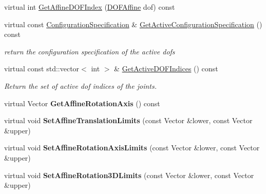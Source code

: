 \begin{DoxyCompactItemize}
\item 
virtual int \hyperlink{classOpenRAVE_1_1RobotBase_a7cfd3a308f74598a3a33a5010137c632}{GetAffineDOFIndex} (\hyperlink{namespaceOpenRAVE_a3016e2185103f3c1bdc5e4482893ca98}{DOFAffine} dof) const 
\item 
\hypertarget{classOpenRAVE_1_1RobotBase_aacdc590ce4cd7f988710a1f684d2d425}{
virtual const \hyperlink{classOpenRAVE_1_1ConfigurationSpecification}{ConfigurationSpecification} \& \hyperlink{classOpenRAVE_1_1RobotBase_aacdc590ce4cd7f988710a1f684d2d425}{GetActiveConfigurationSpecification} () const }
\label{classOpenRAVE_1_1RobotBase_aacdc590ce4cd7f988710a1f684d2d425}

\begin{DoxyCompactList}\small\item\em return the configuration specification of the active dofs \item\end{DoxyCompactList}\item 
\hypertarget{classOpenRAVE_1_1RobotBase_ab0cb7626edf9be09a3b713366439a2c9}{
virtual const std::vector$<$ int $>$ \& \hyperlink{classOpenRAVE_1_1RobotBase_ab0cb7626edf9be09a3b713366439a2c9}{GetActiveDOFIndices} () const }
\label{classOpenRAVE_1_1RobotBase_ab0cb7626edf9be09a3b713366439a2c9}

\begin{DoxyCompactList}\small\item\em Return the set of active dof indices of the joints. \item\end{DoxyCompactList}\item 
\hypertarget{classOpenRAVE_1_1RobotBase_aab0d7f45072809314846897b948e02af}{
virtual Vector {\bfseries GetAffineRotationAxis} () const }
\label{classOpenRAVE_1_1RobotBase_aab0d7f45072809314846897b948e02af}

\item 
\hypertarget{classOpenRAVE_1_1RobotBase_add14e0337082d480614feaae1e213a68}{
virtual void {\bfseries SetAffineTranslationLimits} (const Vector \&lower, const Vector \&upper)}
\label{classOpenRAVE_1_1RobotBase_add14e0337082d480614feaae1e213a68}

\item 
\hypertarget{classOpenRAVE_1_1RobotBase_aef35115a5319c141ba26fa4c7db5d10d}{
virtual void {\bfseries SetAffineRotationAxisLimits} (const Vector \&lower, const Vector \&upper)}
\label{classOpenRAVE_1_1RobotBase_aef35115a5319c141ba26fa4c7db5d10d}

\item 
\hypertarget{classOpenRAVE_1_1RobotBase_a73d18528595acfccfb5dac1b917c931d}{
virtual void {\bfseries SetAffineRotation3DLimits} (const Vector \&lower, const Vector \&upper)}
\label{classOpenRAVE_1_1RobotBase_a73d18528595acfccfb5dac1b917c931d}


\end{DoxyCompactItemize}
